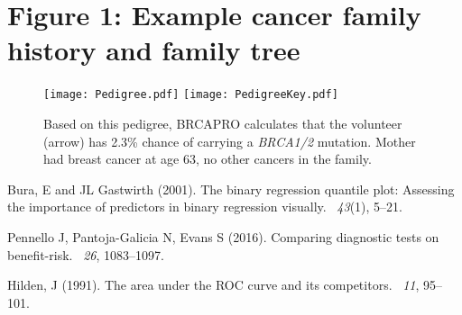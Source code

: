 \documentclass[AMA,STIX1COL]{WileyNJD-v2}
\begin{document}
\section{Figure 1: Example cancer family history and family tree}

\begin{figure}[t!]
	\texttt{[image: Pedigree.pdf]}    
	\texttt{[image: PedigreeKey.pdf]}    
	\caption{Based on this pedigree, BRCAPRO calculates that the volunteer (arrow) has 2.3\% chance of carrying a \textit{BRCA1/2} mutation.  Mother had breast cancer at age 63, no other cancers in the family.}
	\label{fig:Pedigree}
\end{figure}

\begin{thebibliography}{}
	
	Bura, E and JL Gastwirth (2001).
	\newblock The binary regression quantile plot: Assessing the importance of
	predictors in binary regression visually.
	~{\em 43\/}(1), 5--21.
	
	Pennello J, Pantoja-Galicia N, Evans S (2016).
	\newblock Comparing diagnostic tests on benefit-risk.
	~{\em 26}, 1083--1097.
	
	
	Hilden, J (1991).
	\newblock The area under the {ROC} curve and its competitors.
	~{\em 11}, 95--101.
	
\end{thebibliography}


	
\end{document}
